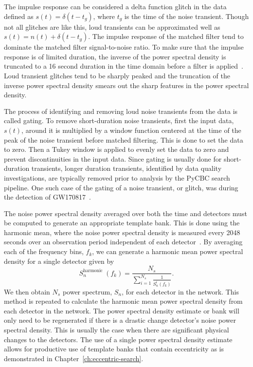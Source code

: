The impulse response can be considered a delta function glitch in the data defined as $s(t) = \delta(t-t_g)$, where $t_g$ is the time of the noise transient. Though not all glitches are like this, loud transients can be approximated well as $s(t) = n(t)+\delta(t-t_g)$. The impulse response of the matched filter tend to dominate the matched filter signal-to-noise ratio. To make sure that the impulse response is of limited duration, the inverse of the power spectral density is truncated to a 16 second duration in the time domain before a filter is applied~\cite{Allen:2005fk}. Loud transient glitches tend to be sharply peaked and the truncation of the inverse power spectral density smears out the sharp features in the power spectral density. 

The process of identifying and removing loud noise transients from the data is called gating. To remove short-duration noise transients, first the input data, $s(t)$, around it is multiplied by a window function centered at the time of the peak of the noise transient before matched filtering. This is done to set the data to zero. Then a Tukey window is applied to evenly set the data to zero and prevent discontinuities in the input data. Since gating is usually done for short-duration transients, longer duration transients, identified by data quality investigations, are typically removed prior to analysis by the PyCBC search pipeline. One such case of the gating of a noise transient, or glitch, was during the detection of GW170817~\cite{TheLIGOScientific:2017qsa}.

The noise power spectral density averaged over both the time and detectors must be computed to generate an appropriate template bank. This is done using the harmonic mean, where the noise power spectral density is measured every 2048 seconds over an observation period independent of each detector~\cite{Allen:2005fk}. By averaging each of the frequency bins, $f_k$, we can generate a harmonic mean power spectral density for a single detector given by
\begin{equation}
    S_{n}^{\text {harmonic }}\left(f_{k}\right)=\frac{N_{s}} {\sum_{i=1}^{N_{s}} \frac{1}{S_{n}^{i}\left(f_{k}\right)}}.
\end{equation}
We then obtain $N_s$ power spectrum, $S_n$, for each detector in the network. This method is repeated to calculate the harmonic mean power spectral density from each detector in the network. The power spectral density estimate or bank will only need to be regenerated if there is a drastic change detector's noise power spectral density. This is usually the case when there are significant physical changes to the detectors. The use of a single power spectral density estimate allows for productive use of template banks that contain eccentricity as is demonstrated in Chapter~\ref{ch:eccentric-search}.

